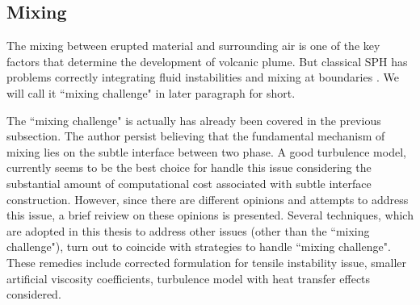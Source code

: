 \subsection{Mixing}

The mixing between erupted material and surrounding air is one of the key factors that determine the development of volcanic plume. 
But classical SPH has problems correctly integrating fluid instabilities and mixing at boundaries \citet{read2010resolving}. We will call it ``mixing challenge" in later paragraph for short.

The ``mixing challenge" is actually has already been covered in the previous subsection. The author persist believing that the fundamental mechanism of mixing lies on the subtle interface between two phase. A good turbulence model, currently seems to be the best choice for handle this issue considering the substantial amount of computational cost associated with subtle interface construction. However, since there are different opinions and attempts to address this issue, a brief reiview on these opinions is presented. Several techniques, which are adopted in this thesis to address other issues (other than the ``mixing challenge"), turn out to coincide with strategies to handle ``mixing challenge". These remedies include corrected formulation for tensile instability issue, smaller artificial viscosity coefficients, turbulence model with heat transfer effects considered.

